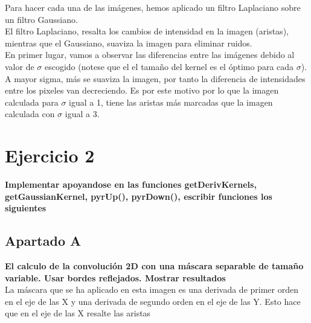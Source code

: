 \documentclass{article}
\begin{document}
Para hacer cada una de las imágenes, hemos aplicado un filtro Laplaciano sobre un filtro Gaussiano.
\\

El filtro Laplaciano, resalta los cambios de intensidad en la imagen (aristas), mientras que el Gaussiano, suaviza la imagen para eliminar ruidos.
\\

En primer lugar, vamos a observar las diferencias entre las imágenes debido al valor de $\sigma$ escogido (notese que el el tamaño del kernel es el óptimo para cada $\sigma$).
\\

A mayor sigma, más se suaviza la imagen, por tanto la diferencia de intensidades entre los pixeles van decreciendo. Es por este motivo por lo que la imagen calculada para $\sigma$ igual a 1, tiene las aristas más marcadas que la imagen calculada con $\sigma$ igual a 3.
\\

\newpage
\section*{Ejercicio 2}
\textbf{Implementar apoyandose en las funciones getDerivKernels, getGaussianKernel, pyrUp(), pyrDown(), escribir funciones los siguientes}

\subsection*{Apartado A}
\textbf{El calculo de la convolución 2D con una máscara separable de tamaño variable. Usar bordes reflejados. Mostrar resultados}
\\

La máscara que se ha aplicado en esta imagen es una derivada de primer orden en el eje de las X y una derivada de segundo orden en el eje de las Y.
\linebreak
Esto hace que en el eje de las X resalte las aristas 
\end{document}
